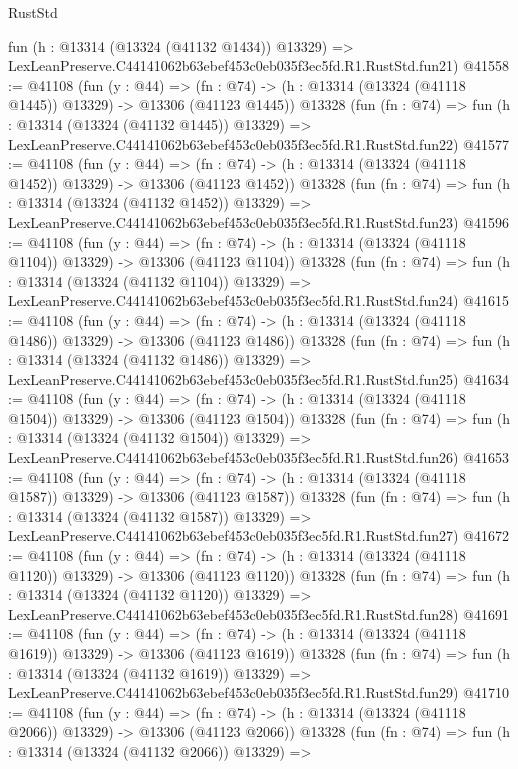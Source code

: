 \begin{lexlean}{RustStd}
\begin{coremodule}
    fun (h : @13314 (@13324 (@41132 @1434)) @13329) =>
    LexLeanPreserve.C44141062b63ebef453c0eb035f3ec5fd.R1.RustStd.fun21)
@41558 := @41108
    (fun (y : @44) =>
    (fn : @74) -> (h : @13314 (@13324 (@41118 @1445)) @13329) -> @13306 (@41123 @1445))
    @13328
    (fun (fn : @74) =>
    fun (h : @13314 (@13324 (@41132 @1445)) @13329) =>
    LexLeanPreserve.C44141062b63ebef453c0eb035f3ec5fd.R1.RustStd.fun22)
@41577 := @41108
    (fun (y : @44) =>
    (fn : @74) -> (h : @13314 (@13324 (@41118 @1452)) @13329) -> @13306 (@41123 @1452))
    @13328
    (fun (fn : @74) =>
    fun (h : @13314 (@13324 (@41132 @1452)) @13329) =>
    LexLeanPreserve.C44141062b63ebef453c0eb035f3ec5fd.R1.RustStd.fun23)
@41596 := @41108
    (fun (y : @44) =>
    (fn : @74) -> (h : @13314 (@13324 (@41118 @1104)) @13329) -> @13306 (@41123 @1104))
    @13328
    (fun (fn : @74) =>
    fun (h : @13314 (@13324 (@41132 @1104)) @13329) =>
    LexLeanPreserve.C44141062b63ebef453c0eb035f3ec5fd.R1.RustStd.fun24)
@41615 := @41108
    (fun (y : @44) =>
    (fn : @74) -> (h : @13314 (@13324 (@41118 @1486)) @13329) -> @13306 (@41123 @1486))
    @13328
    (fun (fn : @74) =>
    fun (h : @13314 (@13324 (@41132 @1486)) @13329) =>
    LexLeanPreserve.C44141062b63ebef453c0eb035f3ec5fd.R1.RustStd.fun25)
@41634 := @41108
    (fun (y : @44) =>
    (fn : @74) -> (h : @13314 (@13324 (@41118 @1504)) @13329) -> @13306 (@41123 @1504))
    @13328
    (fun (fn : @74) =>
    fun (h : @13314 (@13324 (@41132 @1504)) @13329) =>
    LexLeanPreserve.C44141062b63ebef453c0eb035f3ec5fd.R1.RustStd.fun26)
@41653 := @41108
    (fun (y : @44) =>
    (fn : @74) -> (h : @13314 (@13324 (@41118 @1587)) @13329) -> @13306 (@41123 @1587))
    @13328
    (fun (fn : @74) =>
    fun (h : @13314 (@13324 (@41132 @1587)) @13329) =>
    LexLeanPreserve.C44141062b63ebef453c0eb035f3ec5fd.R1.RustStd.fun27)
@41672 := @41108
    (fun (y : @44) =>
    (fn : @74) -> (h : @13314 (@13324 (@41118 @1120)) @13329) -> @13306 (@41123 @1120))
    @13328
    (fun (fn : @74) =>
    fun (h : @13314 (@13324 (@41132 @1120)) @13329) =>
    LexLeanPreserve.C44141062b63ebef453c0eb035f3ec5fd.R1.RustStd.fun28)
@41691 := @41108
    (fun (y : @44) =>
    (fn : @74) -> (h : @13314 (@13324 (@41118 @1619)) @13329) -> @13306 (@41123 @1619))
    @13328
    (fun (fn : @74) =>
    fun (h : @13314 (@13324 (@41132 @1619)) @13329) =>
    LexLeanPreserve.C44141062b63ebef453c0eb035f3ec5fd.R1.RustStd.fun29)
@41710 := @41108
    (fun (y : @44) =>
    (fn : @74) -> (h : @13314 (@13324 (@41118 @2066)) @13329) -> @13306 (@41123 @2066))
    @13328
    (fun (fn : @74) =>
    fun (h : @13314 (@13324 (@41132 @2066)) @13329) =>

\end{coremodule}
\end{lexlean}

